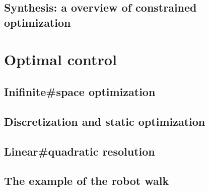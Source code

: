 \documentclass{book}
\begin{document}
\section{Synthesis: a overview of constrained optimization}

\chapter{Optimal control}

\section{Inifinite#space optimization}

\section{Discretization and static optimization}

\section{Linear#quadratic resolution}

\section{The example of the robot walk}
\end{document}
